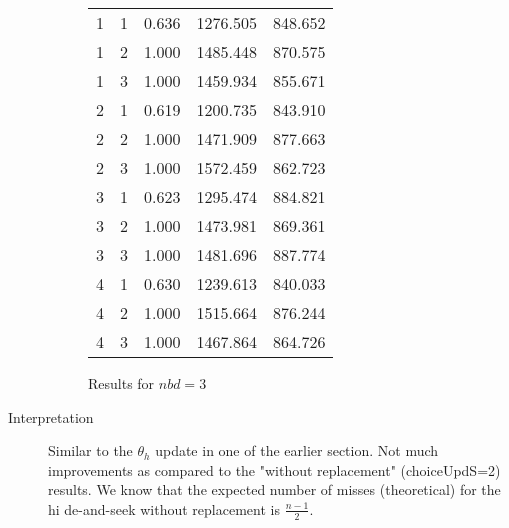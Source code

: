\documentclass[11pt,a4paper,draft]{article}
\begin{document}
\begin{description}
\begin{figure}[!h]
\begin{tabular}{lllll}
			1 & 1 &  0.636 & 1276.505 & 848.652 \\
			1 & 2 &  1.000 & 1485.448 & 870.575 \\
			1 & 3 &  1.000 & 1459.934 & 855.671 \\
			\hline 
			2 & 1 &  0.619 & 1200.735 & 843.910 \\
			2 & 2 &  1.000 & 1471.909 & 877.663 \\
			2 & 3 &  1.000 & 1572.459 & 862.723 \\
			\hline 
			3 & 1 &  0.623 & 1295.474 & 884.821 \\
			3 & 2 &  1.000 & 1473.981 & 869.361 \\
			3 & 3 &  1.000 & 1481.696 & 887.774 \\
			\hline 
			4 & 1 &  0.630 & 1239.613 & 840.033 \\
			4 & 2 &  1.000 & 1515.664 & 876.244 \\
			4 & 3 &  1.000 & 1467.864 & 864.726 \\
			\hline 
			\hline  
		\end{tabular}
		\caption{Results for $nbd = 3$}
	\end{figure}
	\pagebreak
	
	\item[Interpretation] Similar to the $\theta_h$ update in one of the earlier section. Not much improvements as compared to the "without replacement" (choiceUpdS=2) results. We know that the expected number of misses (theoretical) for the hi
de-and-seek without replacement is $\frac{n-1}{2}$.
\end{description}




%
%
	
\end{document}
